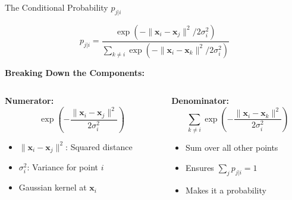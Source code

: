 \documentclass{beamer}
\begin{document}
\begin{frame}{The Conditional Probability $p_{j|i}$}
\vspace{-0.3cm}

\begin{center}
\colorbox{upcblue!10}{
\begin{minipage}{0.85\textwidth}
\centering
\large
$$p_{j|i} = \frac{\exp(-\|\mathbf{x}_i - \mathbf{x}_j\|^2 / 2\sigma_i^2)}{\sum_{k \neq i} \exp(-\|\mathbf{x}_i - \mathbf{x}_k\|^2 / 2\sigma_i^2)}$$
\end{minipage}
}
\end{center}

\vspace{0.2cm}
\textbf{\color{upcblue}Breaking Down the Components:}

\vspace{0.15cm}
\begin{columns}[T]
\begin{column}{0.48\textwidth}
\textbf{Numerator:}
$$\exp\left(-\frac{\|\mathbf{x}_i - \mathbf{x}_j\|^2}{2\sigma_i^2}\right)$$

\footnotesize
\vspace{-0.1cm}
\begin{itemize}
    \setlength\itemsep{0.1em}
    \item $\|\mathbf{x}_i - \mathbf{x}_j\|^2$: Squared distance
    \item $\sigma_i^2$: Variance for point $i$
    \item Gaussian kernel at $\mathbf{x}_i$
\end{itemize}
\end{column}

\begin{column}{0.48\textwidth}
\textbf{Denominator:}
$$\sum_{k \neq i} \exp\left(-\frac{\|\mathbf{x}_i - \mathbf{x}_k\|^2}{2\sigma_i^2}\right)$$

\footnotesize
\vspace{-0.1cm}
\begin{itemize}
    \setlength\itemsep{0.1em}
    \item Sum over all other points
    \item Ensures $\sum_j p_{j|i} = 1$
    \item Makes it a probability
\end{itemize}
\end{column}
\end{columns}

\vspace{0.15cm}
\begin{center}
\end{center}
\end{frame}
\end{document}
